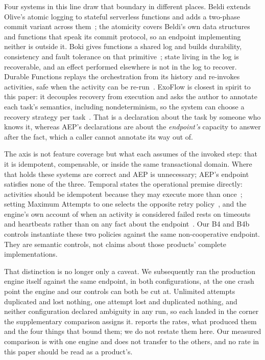 Four systems in this line draw that boundary in different places. Beldi extends
Olive's atomic logging to stateful serverless functions and adds a two-phase
commit variant across them~\cite{zhang2020beldi}; the atomicity covers Beldi's
own data structures and functions that speak its commit protocol, so an endpoint
implementing neither is outside it. Boki gives functions a shared log and builds
durability, consistency and fault tolerance on that primitive~\cite{jia2021boki};
state living in the log is recoverable, and an effect performed elsewhere is not
in the log to recover. Durable Functions replays the orchestration from its
history and re-invokes activities, safe when the activity can be
re-run~\cite{burckhardt2021durable}. ExoFlow is closest in spirit to this paper:
it decouples recovery from execution and asks the author to annotate each task's
semantics, including nondeterminism, so the system can choose a recovery strategy
per task~\cite{zhuang2023exoflow}. That is a declaration about the task by
someone who knows it, whereas AEP's declarations are about the \emph{endpoint's}
capacity to answer after the fact, which a caller cannot annotate its way out of.

The axis is not feature coverage but what each assumes of the invoked step: that
it is idempotent, compensable, or inside the same transactional domain. Where
that holds these systems are correct and AEP is unnecessary; AEP's endpoint
satisfies none of the three. Temporal states the operational premise directly:
activities should be idempotent because they may execute more than
once~\cite{temporal-activity-definition}; setting Maximum Attempts to one selects
the opposite retry policy~\cite{temporal-retry}, and the engine's own account of
when an activity is considered failed rests on timeouts and heartbeats rather
than on any fact about the endpoint~\cite{temporal-activity-failures}. Our B4 and
B4b controls instantiate these two policies against the same non-cooperative
endpoint. They are semantic controls, not claims about those products' complete
implementations.

That distinction is no longer only a caveat. We subsequently ran the production
engine itself against the same endpoint, in both configurations, at the one crash
point the engine and our controls can both be cut at. Unlimited attempts
duplicated and lost nothing, one attempt lost and duplicated nothing, and
neither configuration declared ambiguity in any run, so each landed in the
corner the supplementary comparison assigns it.  reports
the rates, what produced them and the four things that bound them; we do not
restate them here. Our measured comparison is with one engine and does not
transfer to the others, and no rate in this paper should be read as a
product's.

